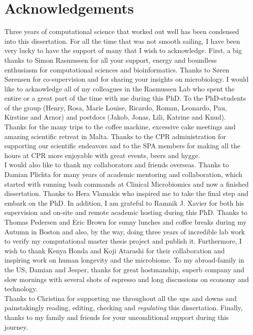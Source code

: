 \chapter{Acknowledgements}
Three years of computational science that worked out well has been condensed into this dissertation. For all the time that was not smooth sailing, I have been very lucky to have the support of many that I wish to acknowledge. First, a big thanks to Simon Rasmussen for all your support, energy and boundless enthusiasm for computational sciences and bioinformatics. Thanks to Søren Sørensen for co-supervision and for sharing your insights on microbiology. I would like to acknowledge all of my colleagues in the Rasmussen Lab who spent the entire or a great part of the time with me during this PhD. To the PhD-students of the group (Henry, Rosa, Marie Louise, Ricardo, Roman, Leonardo, Pau, Kirstine and Arnor) and postdocs (Jakob, Jonas, Lili, Katrine and Knud). Thanks for the many trips to the coffee machine, excessive cake meetings and amazing scientific retreat in Malta. Thanks to the CPR administration for supporting our scientific endeavors and to the SPA members for making all the hours at CPR more enjoyable with great events, beers and hygge.\\
I would also like to thank my collaborators and friends overseas. Thanks to Damian Plichta for many years of academic mentoring and collaboration, which started with running bash commands at Clinical Microbiomics and now a finished dissertation. Thanks to Hera Vlamakis who inspired me to take the final step and embark on the PhD. In addition, I am grateful to Ramnik J. Xavier for both his supervision and on-site and remote academic hosting during this PhD. Thanks to Thomas Pedersen and Eric Brown for sunny lunches and coffee breaks during my Autumn in Boston and also, by the way, doing three years of incredible lab work to verify my computational master thesis project and publish it. Furthermore, I wish to thank Kenya Honda and Koji Atarashi for their collaboration and inspiring work on human longevity and the microbiome. To my abroad-family in the US, Damian and Jesper, thanks for great hostmanship, superb company and slow mornings with several shots of espresso and long discussions on economy and technology.\\
Thanks to Christina for supporting me throughout all the ups and downs and painstakingly reading, editing, checking and \textit{regulating} this dissertation. Finally, thanks to my family and friends for your unconditional support during this journey.